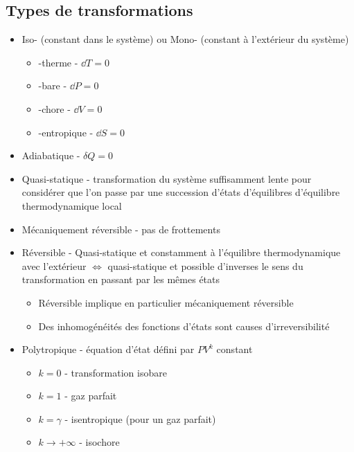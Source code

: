 \documentclass[openany]{book}
\begin{document}
\subsection{Types de transformations}
\begin{itemize}
    \item Iso- (constant dans le système) ou Mono- (constant à l'extérieur du système)
    \begin{itemize}
        \item -therme - $\dd T = 0$
        \item -bare - $\dd P = 0$ 
        \item -chore - $\dd V = 0$
        \item -entropique - $\dd S = 0$
    \end{itemize}
    \item Adiabatique - $\delta Q = 0$ 
    \item Quasi-statique - transformation du système suffisamment lente pour considérer que l'on passe par une succession d'états d'équilibres d'équilibre thermodynamique local
    \item Mécaniquement réversible - pas de frottements
    \item Réversible - Quasi-statique et constamment à l'équilibre thermodynamique avec l'extérieur $\iff$ quasi-statique et possible d'inverses le sens du transformation en passant par les mêmes états
    \begin{itemize}
        \item Réversible implique en particulier mécaniquement réversible
        \item Des inhomogénéités des fonctions d'états sont causes d'irreversibilité 
    \end{itemize}
    \item Polytropique - équation d'état défini par $PV^k$ constant
    \begin{itemize}
        \item $k=0$ - transformation isobare
        \item $k=1$ - gaz parfait
        \item $k=\gamma$ - isentropique (pour un gaz parfait)
        \item $k \rightarrow +\infty$ - isochore
    \end{itemize}
\end{itemize}
\end{document}
